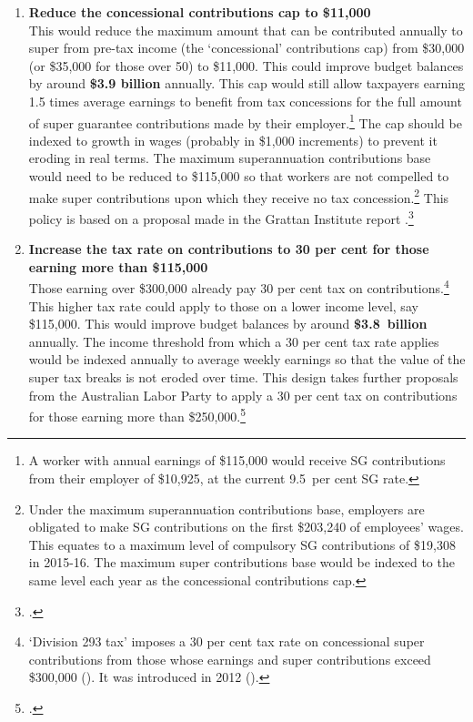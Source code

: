 \DEVIATION{}
\begin{enumerate}
\item 
{\textbf{Reduce the concessional contributions cap to \$11,000}}\\
This would reduce the maximum amount that can be contributed annually to super from pre-tax income (the ‘concessional’ contributions cap) from \$30,000 (or \$35,000 for those over 50) to \$11,000. This could improve budget balances by around \textbf{\$3.9 billion} annually. This cap would still allow taxpayers earning 1.5 times average earnings to benefit from tax concessions for the full amount of super guarantee contributions made by their employer.\footnote{A worker with annual earnings of \$115,000 would receive SG contributions from their employer of \$10,925, at the current 9.5~per cent SG rate.}  The cap should be indexed to growth in wages (probably in \$1,000 increments) to prevent it eroding in real terms. The maximum superannuation contributions base would need to be reduced to \$115,000 so that workers are not compelled to make super contributions upon which they receive no tax concession.\footnote{Under the maximum superannuation contributions base, employers are obligated to make SG contributions on the first \$203,240 of employees’ wages. This equates to a maximum level of compulsory SG contributions of \$19,308 in 2015-16. The maximum super contributions base would be indexed to the same level each year as the concessional contributions cap.}  This policy is based on a proposal made in the Grattan Institute report .\footcite[][32]{DaleyMcGannonSavageEtAl2013BalancingBudgets} \medbreak

\item 
{\textbf{Increase the tax rate on contributions to 30 per cent for those earning more than \$115,000}}\\
Those earning over \$300,000 already pay 30 per cent tax on contributions.\footnote{‘Division 293 tax’ imposes a 30 per cent tax rate on concessional super contributions from those whose earnings and super contributions exceed \$300,000 (\textcite{ATO2015HowisDiv293calculated}). It was introduced in 2012 (\textcite{Shorten2012}).}  This higher tax rate could apply to those on a lower income level, say \$115,000. This would improve budget balances by around \textbf{\$3.8~billion} annually.%
 The income threshold from which a 30 per cent tax rate applies would be indexed annually to average weekly earnings so that the value of the super tax breaks is not eroded over time. This design takes further proposals from the Australian Labor Party to apply a 30 per cent tax on contributions for those earning more than \$250,000.\footcite{ALP2015FairerSuper} 


\end{enumerate}
